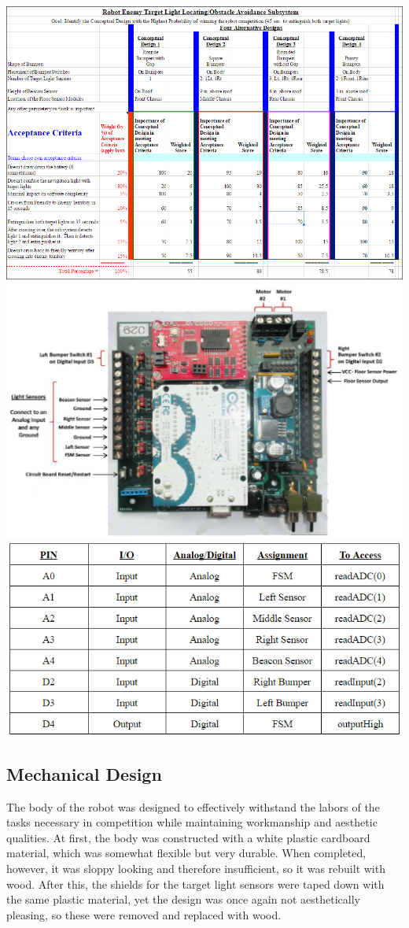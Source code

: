 \documentclass{article}
\begin{document}
\includegraphics[width=\textwidth]{AlternativeDesigns.png}
\includegraphics[width=\textwidth]{IOConnections.png}
\includegraphics[width=\textwidth]{IOTable.png}
\newpage
\subsection{Mechanical Design}
The body of the robot was designed to effectively withstand the labors of the tasks necessary in competition while maintaining workmanship and aesthetic qualities. At first, the body was constructed with a white plastic cardboard material, which was somewhat flexible but very durable. When completed, however, it was sloppy looking and therefore insufficient, so it was rebuilt with wood. After this, the shields for the target light sensors were taped down with the same plastic material, yet the design was once again not aesthetically pleasing, so these were removed and replaced with wood. \\
\end{document}
